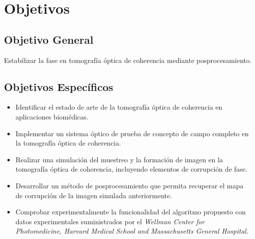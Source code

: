 \section{Objetivos}

\subsection{Objetivo General}
Estabilizar la fase en tomografía óptica de coherencia mediante posprocesamiento.

\subsection{Objetivos Específicos}

\begin{itemize}
	\item Identificar el estado de arte de la tomografía óptica de coherencia en aplicaciones biomédicas.
	\item Implementar un sistema óptico de prueba de concepto de campo completo en la tomografía óptica de coherencia.
	\item Realizar una simulación del muestreo y la formación de imagen en la tomografía óptica de coherencia, incluyendo elementos de corrupción de fase.
	\item Desarrollar un método de posprocesamiento que permita recuperar el mapa de corrupción de la imagen simulada anteriormente.
	\item Comprobar experimentalmente la funcionalidad del algoritmo propuesto con datos experimentales suministrados por el \emph{Wellman Center for Photomedicine, Harvard Medical School and Massachusetts General Hospital}.
	
\end{itemize}

